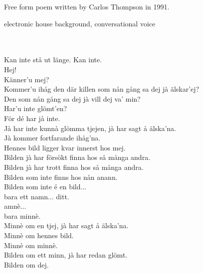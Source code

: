 

\begin{notes}
Free form poem written by Carlos Thompson in 1991.
\end{notes}
\begin{style}
electronic house background, conversational voice
\end{style}
\begin{lyrics}

\\
\\
Kan inte stå ut länge.  Kan inte.\\
Hej!\\
Känner'u mej?\\
Kommer'u ihåg den där killen som nån gång sa dej jà älskar'ej?\\
Den som nån gång sa dej jà vill dej va' min?\\
Har'u inte glömt'en?\\
För dé har jà inte.\\
Jà har inte kunnà glömma tjejen, jà har sagt å älska'na.\\
Jà kommer fortfarande ihåg'na.\\
Hennes bild ligger kvar innerst hos mej.\\
Bilden jà har försökt finna hos så många andra.\\
Bilden jà har trott finna hos så många andra.\\
Bilden som inte finns hos nån anann.\\
Bilden som inte é en bild...\\
bara ett namn...  ditt.\\
amnè...\\
bara minnè.\\
Minnè om en tjej, jà har sagt å älska'na.\\
Minnè om hennes bild.\\
Minnè om minnè.\\
Bilden om ett minn, jà har redan glömt.\\
Bilden om dej.


\end{lyrics}


